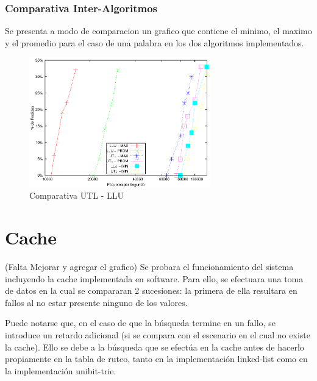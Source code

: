 \subsubsection{Comparativa Inter-Algoritmos}
Se presenta a modo de comparacion un grafico que contiene el minimo, el maximo y el promedio para el caso de una palabra en los dos algoritmos implementados. 
\begin{figure}[!h]
  \centering
	\includegraphics[width=0.7\textwidth]{5-resultados/graf/lluvsutl.eps}
  \caption{Comparativa UTL - LLU}
  \label{figvs}
\end{figure}


\newpage
\section{Cache}

(Falta Mejorar y agregar el grafico)
Se probara el funcionamiento del sistema incluyendo la cache implementada en software. Para ello, se efectuara una toma de datos en la cual se compararan 2 sucesiones: la primera de ella resultara en fallos al no estar presente ninguno de los valores.

Puede notarse que, en el caso de que la búsqueda termine en un fallo, se introduce un retardo adicional (si se compara con el escenario en el cual no existe la cache). Ello se debe a la búsqueda que se efectúa en la cache antes de hacerlo propiamente en la tabla de ruteo, tanto en la implementación linked-list como en la implementación unibit-trie.

